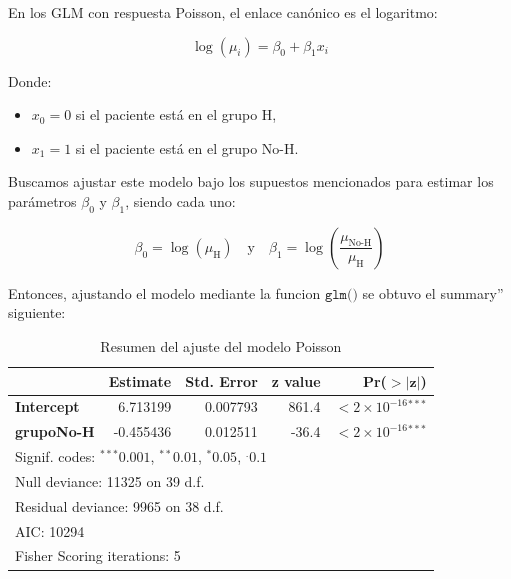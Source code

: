 En los GLM con respuesta Poisson, el enlace canónico es el logaritmo:

\begin{equation}
    \log(\mu_i) = \beta_0 + \beta_1 x_i
    \label{eq:3.1}
\end{equation}

Donde:

\begin{itemize}
    \item $x_0 = 0$ si el paciente está en el grupo H,
    \item $x_1 = 1$ si el paciente está en el grupo No-H.
\end{itemize}

Buscamos ajustar este modelo bajo los supuestos mencionados para estimar los parámetros $\beta_0$ y $\beta_1$, siendo cada uno: 

\begin{equation}
    \beta_0 = \log(\mu_\text{H})\quad \text{y} \quad \beta_1 = \log\left(\frac{\mu_{\text{No-H}}}{\mu_\text{H}}\right)
    \label{eq:3.2}
\end{equation}

Entonces, ajustando el modelo mediante la funcion $\texttt{glm()}$ se obtuvo el summary'' siguiente:

\begin{table}[H]
\centering
\caption{Resumen del ajuste del modelo Poisson}
\begin{tabular}{lrrrr}
\hline
 & \textbf{Estimate} & \textbf{Std. Error} & \textbf{z value} & \textbf{Pr($\mathbf{>|z|}$)} \\
\hline
\textbf{Intercept}  & 6.713199 & 0.007793 & 861.4 & $<2\times 10^{-16}$$^{***}$ \\
\textbf{grupoNo-H}  & -0.455436 & 0.012511 & -36.4 & $<2\times 10^{-16}$$^{***}$ \\
\hline
\multicolumn{5}{l}{\footnotesize Signif. codes: $^{***}0.001$, $^{**}0.01$, $^{*}0.05$, $^{.}0.1$} \\
\multicolumn{5}{l}{\footnotesize Null deviance: 11325 on 39 d.f.} \\
\multicolumn{5}{l}{\footnotesize Residual deviance: 9965 on 38 d.f.} \\
\multicolumn{5}{l}{\footnotesize AIC: 10294} \\
\multicolumn{5}{l}{\footnotesize Fisher Scoring iterations: 5} \\
\end{tabular}
\end{table}

